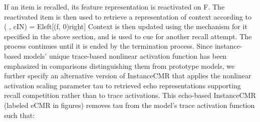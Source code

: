 {}If an item is recalled, its feature representation is reactivated on \markdownRendererDollarSign{}F\markdownRendererDollarSign{}. The reactivated item is then used to retrieve a representation of context according to\markdownRendererInterblockSeparator
{}\markdownRendererDollarSign{}\markdownRendererDollarSign{}(\markdownRendererUnderscore{} , c\markdownRendererCircumflex{}\markdownRendererLeftBrace{}IN\markdownRendererRightBrace{}) = E\markdownRendererBackslash{}left[(f, 0)\markdownRendererBackslash{}right]\markdownRendererDollarSign{}\markdownRendererDollarSign{}\markdownRendererInterblockSeparator
{}Context is then updated using the mechanism for it specified in the above section, and is used to cue for another recall attempt. The process continues until it is ended by the termination process.\markdownRendererInterblockSeparator
{}\markdownRendererInterblockSeparator
{}Since instance-based models' unique trace-based nonlinear activation function has been emphasized in comparisons distinguishing them from prototype models, we further specify an alternative version of InstanceCMR that applies the nonlinear activation scaling parameter \markdownRendererDollarSign{}\markdownRendererBackslash{}tau\markdownRendererDollarSign{} to retrieved echo representations supporting recall competition rather than to trace activations. This echo-based InstanceCMR (labeled eCMR in figures) removes \markdownRendererDollarSign{}\markdownRendererBackslash{}tau\markdownRendererDollarSign{} from the model's trace activation function such that:\markdownRendererInterblockSeparator
